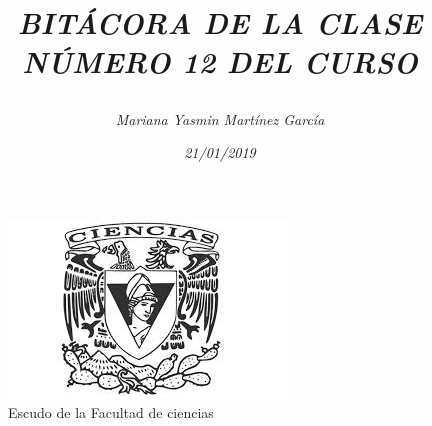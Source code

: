 \documentclass{article}
\title{\Huge\item\color{purple}\textit{BITÁCORA DE LA CLASE NÚMERO 12 DEL CURSO}}
\author{\Large\textit{ Mariana Yasmin Martínez García}}
\date{\Large\textit{ 21/01/2019}}
\begin{document}
\begin{figure}[t]
	\centering
	\includegraphics[width=0.8\linewidth]{Imagenes/1}
	\caption{Escudo de la Facultad de ciencias}
	\label{fig:1}
\end{figure}
	\maketitle
		
	\newpage
	
\end{document}
